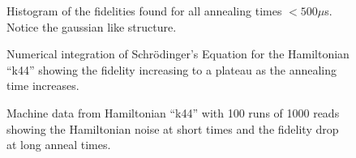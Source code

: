 \begin{figure}
	\caption[Short Time Fidelity Histogram]{Histogram of the fidelities found for all annealing times  $< 500 \mu$s.  Notice the gaussian like structure.}
	\label{fig:fid_hist}
\end{figure}

\begin{figure}
	\caption[Simulation of Schr\"odinger's Equation]{Numerical integration of Schr\"odinger's Equation for the Hamiltonian ``k44'' showing the fidelity increasing to a plateau as the annealing time increases.}
	\label{fig:simulated_anneal}
\end{figure}

\begin{figure}
	\caption[Long Time Anneal]{Machine data from Hamiltonian ``k44'' with 100 runs of 1000 reads showing the Hamiltonian noise at short times and the fidelity drop at long anneal times.}
	\label{fig:k44_long}
\end{figure}
